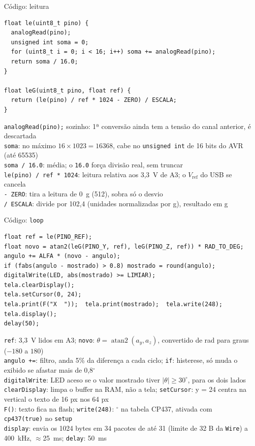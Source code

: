 \documentclass[aspectratio=169]{beamer}
\newcommand{\hl}[1]{{\setlength{\fboxsep}{1pt}\colorbox{green!25}{\rmfamily\upshape #1}}}
\begin{document}
\begin{frame}[fragile]{Código: leitura}
\begin{lstlisting}[basicstyle=\ttfamily\scriptsize]
float le(uint8_t pino) {
  analogRead(pino);
  unsigned int soma = 0;
  for (uint8_t i = 0; i < 16; i++) soma += analogRead(pino);
  return soma / 16.0;
}

float leG(uint8_t pino, float ref) {
  return (le(pino) / ref * 1024 - ZERO) / ESCALA;
}
\end{lstlisting}
\scriptsize
\hl{\texttt{analogRead(pino);} sozinho: 1ª conversão ainda tem a tensão do canal anterior, é descartada}\\[2pt]
\hl{\texttt{soma}: no máximo $16 \times 1023 = 16368$, cabe no \texttt{unsigned int} de 16 bits do AVR (até 65535)}\\[2pt]
\hl{\texttt{soma / 16.0}: média; o \texttt{16.0} força divisão real, sem truncar}\\[2pt]
\hl{\texttt{le(pino) / ref * 1024}: leitura relativa aos 3,3~V de A3; o $V_\text{ref}$ do USB se cancela}\\[2pt]
\hl{\texttt{- ZERO}: tira a leitura de 0~g (512), sobra só o desvio}\\[2pt]
\hl{\texttt{/ ESCALA}: divide por 102,4 (unidades normalizadas por g), resultado em g}
\end{frame}

\begin{frame}[fragile]{Código: \texttt{loop}}
\begin{lstlisting}[basicstyle=\ttfamily\scriptsize]
float ref = le(PINO_REF);
float novo = atan2(leG(PINO_Y, ref), leG(PINO_Z, ref)) * RAD_TO_DEG;
angulo += ALFA * (novo - angulo);
if (fabs(angulo - mostrado) > 0.8) mostrado = round(angulo);
digitalWrite(LED, abs(mostrado) >= LIMIAR);
tela.clearDisplay();
tela.setCursor(0, 24);
tela.print(F("X  "));  tela.print(mostrado);  tela.write(248);
tela.display();
delay(50);
\end{lstlisting}
\scriptsize
\hl{\texttt{ref}: 3,3~V lidos em A3; \texttt{novo}: $\theta = \operatorname{atan2}(a_y, a_z)$, convertido de rad para graus ($-180$ a $180$)}\\[2pt]
\hl{\texttt{angulo +=}: filtro, anda 5\% da diferença a cada ciclo; \texttt{if}: histerese, só muda o exibido se afastar mais de 0,8$^\circ$}\\[2pt]
\hl{\texttt{digitalWrite}: LED aceso se o valor mostrado tiver $|\theta| \geq 30^\circ$, para os dois lados}\\[2pt]
\hl{\texttt{clearDisplay}: limpa o buffer na RAM, não a tela; \texttt{setCursor}: y = 24 centra na vertical o texto de 16 px nos 64 px}\\[2pt]
\hl{\texttt{F()}: texto fica na flash; \texttt{write(248)}: $^\circ$ na tabela CP437, ativada com \texttt{cp437(true)} no \texttt{setup}}\\[2pt]
\hl{\texttt{display}: envia os 1024 bytes em 34 pacotes de até 31 (limite de 32 B da \texttt{Wire}) a 400~kHz, $\approx$25~ms; \texttt{delay}: 50~ms}
\end{frame}
\end{document}

